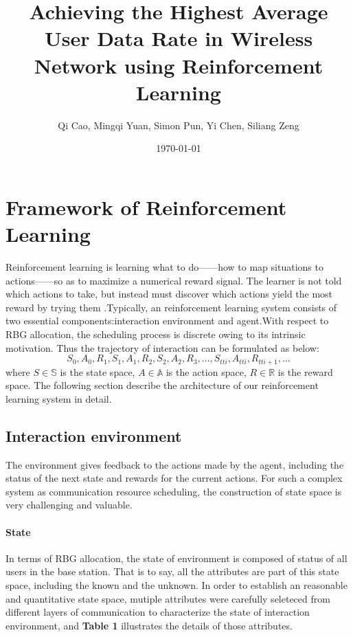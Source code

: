 \documentclass{article}
\title{Achieving the Highest Average User Data Rate in Wireless Network using Reinforcement Learning}
\author{Qi Cao, Mingqi Yuan, Simon Pun, Yi Chen, Siliang Zeng}
\date{\today}
\begin{document}
\maketitle
\section{Framework of Reinforcement Learning}
Reinforcement learning is learning what to do——how to map situations to actions——so as to maximize a numerical reward signal.
The learner is not told which actions to take, but instead must discover which actions yield the most reward by trying them 
\cite{Sutton1998Reinforcement}.Typically, an reinforcement learning system consists of two essential components:interaction 
environment and agent.With respect to RBG allocation, the scheduling process is discrete owing to its intrinsic motivation.
Thus the trajectory of interaction can be formulated as below: 
$$
S_0, A_0, R_1, S_1, A_1, R_2, S_2, A_2, R_3, ... ,S_{tti}, A_{tti}, R_{tti+1},...
$$
where $S \in \mathbb{S}$ is the state space, $A \in \mathbb{A}$ is the action space, $R \in \mathbb{R}$ is the reward space.
The following section describe the architecture of our reinforcement learning system in detail.
\subsection{Interaction environment}
The environment gives feedback to the actions made by the agent, including the status of the next state and rewards for the current actions.
For such a complex system as communication resource scheduling, the construction of state space is very challenging and valuable.
\paragraph{State}
In terms of RBG allocation, the state of environment is composed of status of all users in the base station.
That is to say, all the attributes are part of this state space, including the known and the unknown.
In order to establish an reasonable and quantitative state space, 
mutiple attributes were carefully seleteced from different layers of communication to characterize the state of interaction environment, 
and \textbf{Table 1} illustrates the details of those attributes.
\end{document}
